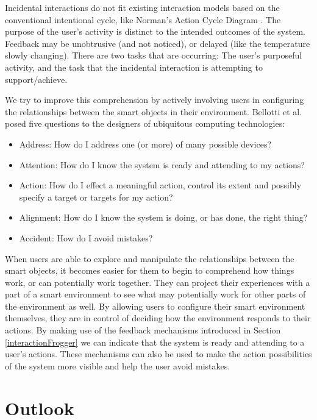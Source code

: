 	Incidental interactions do not fit existing interaction models based on the conventional intentional cycle, like Norman's Action Cycle Diagram \cite{Norman1998}. The purpose of the user's activity is distinct to the intended outcomes of the system. Feedback may be unobtrusive (and not noticed), or delayed (like the temperature slowly changing). There are two tasks that are occurring: The user's purposeful activity, and the task that the incidental interaction is attempting to support/achieve.

We try to improve this comprehension by actively involving users in configuring the relationships between the smart objects in their environment. Bellotti et al. \cite{Bellotti2002} posed five questions to the designers of ubiquitous computing technologies:

\begin{itemize}
	\item Address: How do I address one (or more) of many possible devices?
	\item Attention: How do I know the system is ready and attending to my actions?
	\item Action: How do I effect a meaningful action, control its extent and possibly specify a target or targets for my action?
	\item Alignment: How do I know the system is doing, or has done, the right thing?
	\item Accident: How do I avoid mistakes?
\end{itemize}

When users are able to explore and manipulate the relationships between the smart objects, it becomes easier for them to begin to comprehend how things work, or can potentially work together. They can project their experiences with a part of a smart environment to see what may potentially work for other parts of the environment as well. 
By allowing users to configure their smart environment themselves, they are in control of deciding how the environment responds to their actions. By making use of the feedback mechanisms introduced in Section \ref{interactionFrogger} we can indicate that the system is ready and attending to a user's actions. These mechanisms can also be used to make the action possibilities of the system more visible and help the user avoid mistakes.


\section{Outlook}

